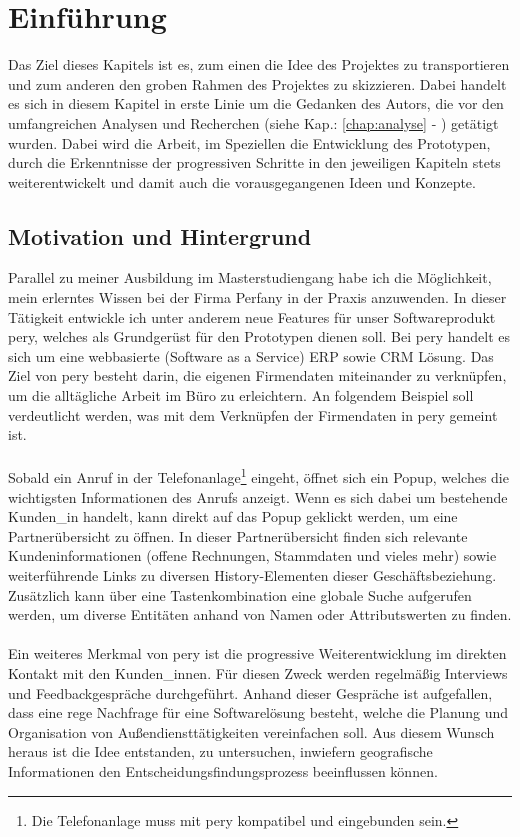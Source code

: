 \documentclass[Bachelorarbeit.tex]{subfiles}
\begin{document}
\chapter{Einführung}
\label{chap:einfuehrung}

Das Ziel dieses Kapitels ist es, zum einen die Idee des Projektes zu transportieren und zum anderen den groben Rahmen des Projektes zu skizzieren.
Dabei handelt es sich in diesem Kapitel in erste Linie um die Gedanken des Autors, die vor den umfangreichen Analysen und Recherchen (siehe Kap.: \ref{chap:analyse} - ) getätigt wurden.
Dabei wird die Arbeit, im Speziellen die Entwicklung des Prototypen, durch die Erkenntnisse der progressiven Schritte in den jeweiligen Kapiteln stets weiterentwickelt und damit auch die vorausgegangenen Ideen und Konzepte.


\section{Motivation und Hintergrund}
\label{chap:einfuehrung:sec:hintergrund}
Parallel zu meiner Ausbildung im Masterstudiengang habe ich die Möglichkeit, mein erlerntes Wissen bei der Firma Perfany in der Praxis anzuwenden.
In dieser Tätigkeit entwickle ich unter anderem neue Features für unser Softwareprodukt pery, welches als Grundgerüst für den Prototypen dienen soll.
Bei pery handelt es sich um eine webbasierte (Software as a Service) \ac{ERP} sowie \ac{CRM} Lösung.
Das Ziel von pery besteht darin, die eigenen Firmendaten miteinander zu verknüpfen, um die alltägliche Arbeit im Büro zu erleichtern.
An folgendem Beispiel soll verdeutlicht werden, was mit dem Verknüpfen der Firmendaten in pery gemeint ist.\\
\\
Sobald ein Anruf in der Telefonanlage\footnote{Die Telefonanlage muss mit pery kompatibel und eingebunden sein.} eingeht, öffnet sich ein Popup, welches die wichtigsten Informationen des Anrufs anzeigt. 
Wenn es sich dabei um bestehende Kunden\_in handelt, kann direkt auf das Popup geklickt werden, um eine Partnerübersicht zu öffnen.
In dieser Partnerübersicht finden sich relevante Kundeninformationen (offene Rechnungen, Stammdaten und vieles mehr) sowie weiterführende Links zu diversen History-Elementen dieser Geschäftsbeziehung.
Zusätzlich kann über eine Tastenkombination eine globale Suche aufgerufen werden, um diverse Entitäten anhand von Namen oder Attributswerten zu finden. \\
\\
Ein weiteres Merkmal von pery ist die progressive Weiterentwicklung im direkten Kontakt mit den Kunden\_innen.
Für diesen Zweck werden regelmäßig Interviews und Feedbackgespräche durchgeführt.
Anhand dieser Gespräche ist aufgefallen, dass eine rege Nachfrage für eine Softwarelösung besteht, welche die Planung und Organisation von Außendiensttätigkeiten vereinfachen soll.
Aus diesem Wunsch heraus ist die Idee entstanden, zu untersuchen, inwiefern geografische Informationen den Entscheidungsfindungsprozess beeinflussen können.
\end{document}

